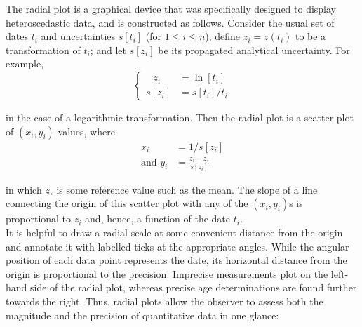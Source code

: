 \begin{refsection}
The radial plot is a graphical device that was specifically designed
to display heteroscedastic data, and is constructed as follows.
Consider the usual set of dates $t_i$ and uncertainties $s[t_i]$ (for
$1 \leq i \leq n$); define $z_i = z(t_i)$ to be a transformation of
$t_i$; and let $s[z_i]$ be its propagated analytical uncertainty.
For example,
\begin{equation}
  \begin{cases}
  \phantom{s[}z_i\phantom{]}\! & \! = \ln[t_i]\\
  s[z_i]\! & \! = s[t_i]/t_i
  \end{cases}
  \label{eq:logtransform}
\end{equation}

\noindent in the case of a logarithmic transformation. Then the radial
plot is a scatter plot of $(x_i,y_i)$ values, where
\begin{equation}
  \begin{split}
    x_i & = 1/s[z_i] \\
    \mbox{and~} y_i & = \frac{z_i-z_\circ}{s[z_i]}
  \end{split}
  \label{eq:radial}
\end{equation}

\noindent in which $z_\circ$ is some reference value such
as the mean. The slope of a line connecting the origin of this scatter
plot with any of the $(x_i,y_i)$s is proportional to $z_i$ and, hence,
a function of the date $t_i$.\\

It is helpful to draw a radial scale at some convenient distance from
the origin and annotate it with labelled ticks at the appropriate
angles. While the angular position of each data point represents the
date, its horizontal distance from the origin is proportional to the
precision. Imprecise measurements plot on the left-hand side of the
radial plot, whereas precise age determinations are found further
towards the right. Thus, radial plots allow the observer to assess
both the magnitude and the precision of quantitative data in one
glance:


\end{refsection}
